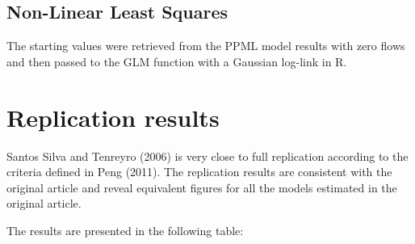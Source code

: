 \documentclass[12pt]{article}
\newenvironment{Shaded}{\begin{snugshade}}{\end{snugshade}}
\newcommand{\AttributeTok}[1]{\textcolor[rgb]{0.40,0.45,0.13}{#1}}
\newcommand{\ConstantTok}[1]{\textcolor[rgb]{0.56,0.35,0.01}{#1}}
\newcommand{\DecValTok}[1]{\textcolor[rgb]{0.68,0.00,0.00}{#1}}
\newcommand{\FunctionTok}[1]{\textcolor[rgb]{0.28,0.35,0.67}{#1}}
\newcommand{\NormalTok}[1]{\textcolor[rgb]{0.00,0.23,0.31}{#1}}
\newcommand{\OtherTok}[1]{\textcolor[rgb]{0.00,0.23,0.31}{#1}}
\newcommand{\SpecialCharTok}[1]{\textcolor[rgb]{0.37,0.37,0.37}{#1}}
\newcommand{\StringTok}[1]{\textcolor[rgb]{0.13,0.47,0.30}{#1}}
\begin{document}
\subsection{Non-Linear Least Squares}\label{non-linear-least-squares}

The starting values were retrieved from the PPML model results with zero
flows and then passed to the GLM function with a Gaussian log-link in R.

\begin{Shaded}
\end{Shaded}

\section{Replication results}\label{replication-results}

Santos Silva and Tenreyro (2006) is very close to full replication
according to the criteria defined in Peng (2011). The replication
results are consistent with the original article and reveal equivalent
figures for all the models estimated in the original article.

The results are presented in the following table:
\end{document}
